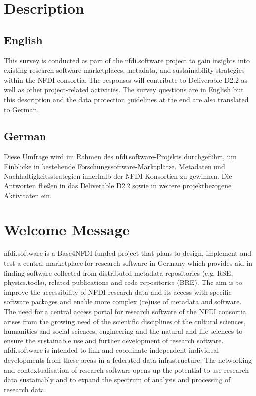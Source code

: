 \documentclass[headsepline,titlepage,twoside,12pt,toc=flat,headings=normal]{scrreprt}
\begin{document}
\section{Description}
\subsection{English}
This survey is conducted as part of the nfdi.software project to gain insights into existing research software marketplaces, metadata, and sustainability strategies within the NFDI consortia.
The responses will contribute to Deliverable D2.2 as well as other project-related activities.
The survey questions are in English but this description and the data protection guidelines at the end are also translated to German.

\subsection{German}
Diese Umfrage wird im Rahmen des nfdi.software-Projekts durchgeführt, um Einblicke in bestehende Forschungssoftware-Marktplätze, Metadaten und Nachhaltigkeitsstrategien innerhalb der NFDI-Konsortien zu gewinnen.
Die Antworten fließen in das Deliverable D2.2 sowie in weitere projektbezogene Aktivitäten ein.

\section{Welcome Message}
nfdi.software is a Base4NFDI funded project that plans to design, implement and test a central marketplace for research software in Germany which provides aid in finding software collected from distributed metadata repositories (e.g. RSE, physics.tools), related publications and code repositories (BRE).
The aim is to improve the accessibility of NFDI research data and its access with specific software packages and enable more complex (re)use of metadata and software.
The need for a central access portal for research software of the NFDI consortia arises from the growing need of the scientific disciplines of the cultural sciences, humanities and social sciences, engineering and the natural and life sciences to ensure the sustainable use and further development of research software.
nfdi.software is intended to link and coordinate independent individual developments from these areas in a federated data infrastructure.
The networking and contextualisation of research software opens up the potential to use research data sustainably and to expand the spectrum of analysis and processing of research data.
\end{document}
